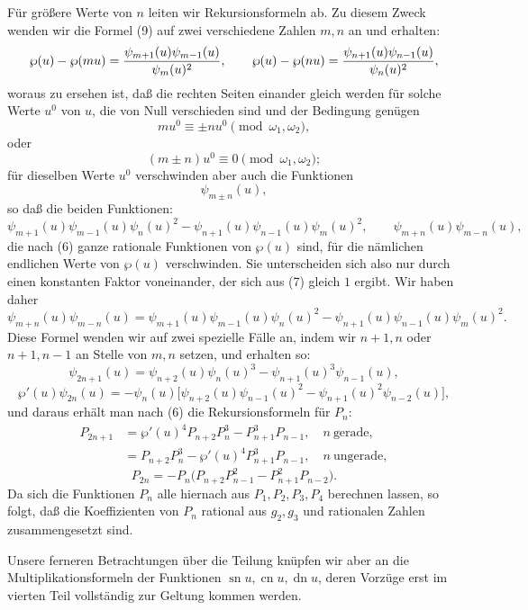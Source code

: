 \documentclass[11pt]{article}
\providecommand{\sn}{\operatorname{sn}}
\providecommand{\cn}{\operatorname{cn}}
\providecommand{\dn}{\operatorname{dn}}
\begin{document}
Für größere Werte von $n$ leiten wir Rekursionsformeln ab. Zu diesem Zweck wenden wir
die Formel (9) auf zwei verschiedene Zahlen $m,n$ an und erhalten:
\[
\wp(u)-\wp(mu)={\psi_{m+1}(u)\psi_{m-1}(u)\over\psi_m(u)^2},\qquad
\wp(u)-\wp(nu)={\psi_{n+1}(u)\psi_{n-1}(u)\over\psi_n(u)^2},
\]
woraus zu ersehen ist, daß die rechten Seiten einander gleich werden für solche Werte
$u^0$ von $u$, die von Null verschieden sind und der Bedingung genügen
\[
mu^0\equiv \pm nu^0\pmod{\omega_1,\omega_2},
\]
oder
\[
(m\pm n)u^0\equiv0\pmod{\omega_1,\omega_2};
\]
für dieselben Werte $u^0$ verschwinden aber auch die Funktionen
\[
\psi_{m\pm n}(u),
\]
so daß die beiden Funktionen:
\[
\psi_{m+1}(u)\psi_{m-1}(u)\psi_n(u)^2
-\psi_{n+1}(u)\psi_{n-1}(u)\psi_m(u)^2,\qquad
\psi_{m+n}(u)\psi_{m-n}(u),
\]
die nach (6) ganze rationale Funktionen von $\wp(u)$ sind, für die nämlichen endlichen
Werte von $\wp(u)$ verschwinden. Sie unterscheiden sich also nur durch einen konstanten
Faktor voneinander, der sich aus (7) gleich $1$ ergibt. Wir haben daher
\begin{equation}
\psi_{m+n}(u)\psi_{m-n}(u)
=\psi_{m+1}(u)\psi_{m-1}(u)\psi_n(u)^2
-\psi_{n+1}(u)\psi_{n-1}(u)\psi_m(u)^2.
\tag{14}
\end{equation}
Diese Formel wenden wir auf zwei spezielle Fälle an, indem wir $n+1,n$ oder $n+1,n-1$
an Stelle von $m,n$ setzen, und erhalten so:
\[
\psi_{2n+1}(u)=\psi_{n+2}(u)\psi_n(u)^3-\psi_{n+1}(u)^3\psi_{n-1}(u),
\]
\[
\wp'(u)\psi_{2n}(u)=
-\psi_n(u)\bigl[\psi_{n+2}(u)\psi_{n-1}(u)^2
-\psi_{n+1}(u)^2\psi_{n-2}(u)\bigr],
\]
und daraus erhält man nach (6) die Rekursionsformeln für $P_n$:
\begin{equation}
\begin{aligned}
P_{2n+1}&=\wp'(u)^4P_{n+2}P_n^3-P_{n+1}^3P_{n-1},\quad n\ \text{gerade},\\
&=P_{n+2}P_n^3-\wp'(u)^4P_{n+1}^3P_{n-1},\quad n\ \text{ungerade},
\end{aligned}
\tag{15}
\end{equation}
\begin{equation}
P_{2n}=-P_n\bigl(P_{n+2}P_{n-1}^2-P_{n+1}^2P_{n-2}\bigr).
\tag{16}
\end{equation}
Da sich die Funktionen $P_n$ alle hiernach aus $P_1,P_2,P_3,P_4$ berechnen lassen, so
folgt, daß die Koeffizienten von $P_n$ rational aus $g_2,g_3$ und rationalen Zahlen
zusammengesetzt sind.

Unsere ferneren Betrachtungen über die Teilung knüpfen wir aber an die
Multiplikationsformeln der Funktionen $\sn u,\cn u,\dn u$, deren Vorzüge erst im vierten
Teil vollständig zur Geltung kommen werden.
\end{document}
